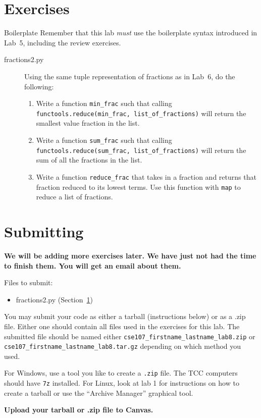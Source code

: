 \documentclass[11pt]{cselabheader}
\begin{document}
\pagebreak


\section{Exercises}
\label{sec:ex}

\begin{warningbox}{Boilerplate}
  Remember that this lab \emph{must} use the
  boilerplate syntax introduced in Lab~5, including the review exercises.
\end{warningbox}

\begin{description}
  \item[fractions2.py] Using the same tuple representation of fractions as in
    Lab~6, do the following:

    \begin{enumerate}
      \item Write a function \lstinline{min_frac} such that calling
        \lstinline{functools.reduce(min_frac, list_of_fractions)} will return
        the smallest value fraction in the list.
      \item Write a function \lstinline{sum_frac} such that calling
        \lstinline{functools.reduce(sum_frac, list_of_fractions)} will return
        the sum of all the fractions in the list.
      \item Write a function \lstinline{reduce_frac} that takes in a fraction and
        returns that fraction reduced to its lowest terms. Use this function with
        \lstinline{map} to reduce a list of fractions.
    \end{enumerate}
\end{description}

\pagebreak
\section{Submitting}

\begin{center}
  \textbf{We will be adding more exercises later. We have just not had the time
  to finish them. You will get an email about them.}
\end{center}

Files to submit:
\begin{itemize}
  \item fractions2.py (Section~\ref{sec:ex})
\end{itemize}

You may submit your code as either a tarball (instructions below) or as a .zip
file. Either one should contain all files used in the exercises for this lab.
The submitted file should be named either
\texttt{cse107\_firstname\_lastname\_lab8.zip} or
\texttt{cse107\_firstname\_lastname\_lab8.tar.gz} depending on which method you
used.

For Windows, use a tool you like to create a \texttt{.zip} file. The TCC
computers should have \texttt{7z} installed. For Linux, look at lab 1 for
instructions on how to create a tarball or use the ``Archive Manager'' graphical
tool.

\begin{center}
  \textbf{Upload your tarball or .zip file to Canvas.}
\end{center}
\end{document}
